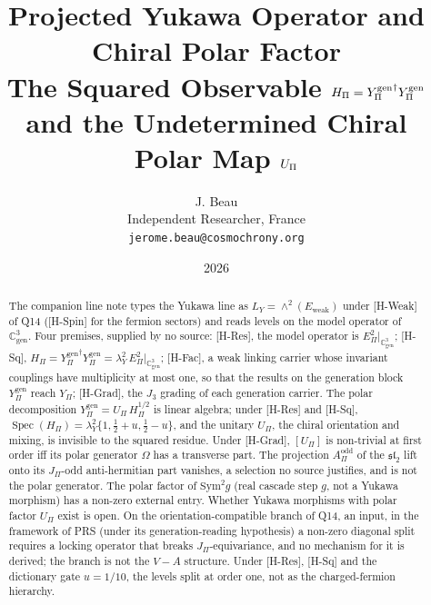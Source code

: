 \documentclass[11pt]{article}
\title{
  Projected Yukawa Operator and Chiral Polar Factor
  \\[1ex]
  \large The Squared Observable $\Hpi = \Ygen^{\dagger}\Ygen$ and the Undetermined Chiral Polar Map $\Upi$
}
\author{J. Beau\\
Independent Researcher, France\\
\texttt{jerome.beau@cosmochrony.org}}
\date{2026}
\theoremstyle{definition}
\theoremstyle{remark}
\newcommand{\JPi}{J_{\Pi}}
\newcommand{\Jthree}{J_{3}}
\newcommand{\Cgen}{\mathbb{C}^{3}_{\mathrm{gen}}}
\newcommand{\Epi}{E_{\Pi}}
\newcommand{\Eweak}{E_{\mathrm{weak}}}
\newcommand{\LY}{L_{Y}}
\newcommand{\Ypi}{Y_{\Pi}}
\newcommand{\Ygen}{{Y^{\mathrm{gen}}_{\Pi}}}
\newcommand{\Hpi}{H_{\Pi}}
\newcommand{\Upi}{U_{\Pi}}
\newcommand{\Opol}{\Omega}
\newcommand{\Aodd}{A_{\Pi}^{\mathrm{odd}}}
\newcommand{\lamY}{\lambda_{Y}}
\newcommand{\Sym}{\mathrm{Sym}}
\newcommand{\Spec}{\operatorname{Spec}}
\begin{document}
  \maketitle

  \begin{abstract}
    The companion line note types the Yukawa line as \texorpdfstring{$\LY = \wedge^{2}(\Eweak)$}{L_Y = ∧²(E_weak)} under
    [H-Weak] of Q14 ([H-Spin] for the
    fermion sectors) and reads levels on the model operator of \texorpdfstring{$\Cgen$}{ℂ³_gen}.
    Four premises, supplied by no source:
    [H-Res], the model operator is \texorpdfstring{$\Epi^{2}|_{\Cgen}$}{E_Π² restricted to ℂ³_gen};
    [H-Sq], \texorpdfstring{$\Hpi = \Ygen^{\dagger}\Ygen = \lamY^{2}\,\Epi^{2}|_{\Cgen}$}{H_Π = (Y^gen_Π)† Y^gen_Π =
      λ_Y² E_Π² restricted to ℂ³_gen};
    [H-Fac], a weak linking carrier whose invariant couplings have multiplicity at most one, so that the results on
    the generation block \texorpdfstring{$\Ygen$}{Y^gen_Π} reach \texorpdfstring{$\Ypi$}{Y_Π};
    [H-Grad], the \texorpdfstring{$\Jthree$}{J_3} grading of each generation carrier.
    The polar decomposition \texorpdfstring{$\Ygen = \Upi\,\Hpi^{1/2}$}{Y^gen_Π = U_Π H_Π^½} is linear algebra; under
    [H-Res] and [H-Sq],
    \texorpdfstring{$\Spec(\Hpi) = \lamY^{2}\{1, \tfrac12 + u, \tfrac12 - u\}$}{the eigenvalues of H_Π are λ_Y² times
      each of 1, ½ + u, ½ − u}, and the unitary \texorpdfstring{$\Upi$}{U_Π}, the chiral orientation and
    mixing, is invisible to the squared residue.
    Under [H-Grad], \texorpdfstring{$[\Upi]$}{[U_Π]} is non-trivial at first order iff its polar generator
    \texorpdfstring{$\Opol$}{Ω} has a transverse part.
    The projection \texorpdfstring{$\Aodd$}{A_Π^odd} of the \texorpdfstring{$\mathfrak{sl}_{2}$}{sl_2} lift onto its
    \texorpdfstring{$\JPi$}{J_Π}-odd anti-hermitian part vanishes, a
    selection no source justifies, and is not the polar generator.
    The polar factor of \texorpdfstring{$\Sym^{2}g$}{Sym²g} (real cascade step \texorpdfstring{$g$}{g}, not a Yukawa
    morphism) has a non-zero external entry.
    Whether Yukawa morphisms with polar factor \texorpdfstring{$\Upi$}{U_Π} exist is open.
    On the orientation-compatible branch of Q14, an input, in the framework of PRS (under its generation-reading hypothesis) a non-zero diagonal
    split requires a locking operator that breaks \texorpdfstring{$\JPi$}{J_Π}-equivariance, and no mechanism for it is
    derived; the branch is not the
    \texorpdfstring{$V{-}A$}{V−A} structure.
    Under [H-Res], [H-Sq] and the dictionary gate \texorpdfstring{$u = 1/10$}{u = 1/10}, the levels split at order one,
    not as the
    charged-fermion hierarchy.
  \end{abstract}
\end{document}

